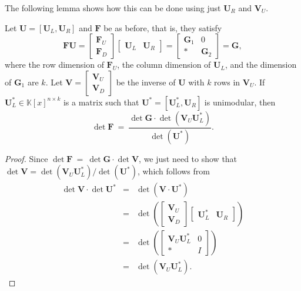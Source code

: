 The following lemma shows how this can be done using just $\mathbf{U}_{R}$
and $\mathbf{V}_{U}$.
\begin{lem}
\label{lem:scalingToDeterminant} Let $\mathbf{U}=\left[\mathbf{U}_{L},\mathbf{U}_{R}\right]$
and $\mathbf{F}$ be as before, that is, they satisfy 
\[
\mathbf{F}\mathbf{U}=\begin{bmatrix}\mathbf{F}_{U}\\
\mathbf{F}_{D}
\end{bmatrix}\begin{bmatrix}\mathbf{U}_{L} & \mathbf{U}_{R}\end{bmatrix}=\begin{bmatrix}\mathbf{G}_{1} & 0\\
* & \mathbf{G}_{2}
\end{bmatrix}=\mathbf{G},
\]
 where the row dimension of $\mathbf{F}_{U}$, the column dimension
of $\mathbf{U}_{L}$, and the dimension of $\mathbf{G}_{1}$ are $k$.
Let $\mathbf{V}=\begin{bmatrix}\mathbf{V}_{U}\\
\mathbf{V}_{D}
\end{bmatrix}$ be the inverse of $\mathbf{U}$ with $k$ rows in $\mathbf{V}_{U}$.
If $\mathbf{U}_{L}^{*}\in\mathbb{K}\left[x\right]^{n\times k}$ is
a matrix such that $\mathbf{U}^{*}=\left[\mathbf{U}_{L}^{*},\mathbf{U}_{R}\right]$
is unimodular, then 
\[
\det\mathbf{F}~=~\frac{\det\mathbf{G}\cdot\det\left(\mathbf{V}_{U}\mathbf{U}_{L}^{*}\right)}{\det\left(\mathbf{U}^{*}\right)}.
\]
\end{lem}
\begin{proof}
Since $\det\mathbf{F}~=~\det\mathbf{G}\cdot\det\mathbf{V}$, we just
need to show that $\det\mathbf{V}=\det\left(\mathbf{V}_{U}\mathbf{U}_{L}^{*}\right)/\det\left(\mathbf{U}^{*}\right)$,
which follows from 
\begin{eqnarray*}
\det\mathbf{V}\cdot\det\mathbf{U}^{*} & = & \det\left(\mathbf{V}\cdot\mathbf{U}^{*}\right)\\
 & = & \det\left(\begin{bmatrix}\mathbf{V}_{U}\\
\mathbf{V}_{D}
\end{bmatrix}\begin{bmatrix}\mathbf{U}_{L}^{*} & \mathbf{U}_{R}\end{bmatrix}\right)\\
 & = & \det\left(\begin{bmatrix}\mathbf{V}_{U}\mathbf{U}_{L}^{*} & 0\\
* & I
\end{bmatrix}\right)\\
 & = & \det\left(\mathbf{V}_{U}\mathbf{U}_{L}^{*}\right).
\end{eqnarray*}

\end{proof}
